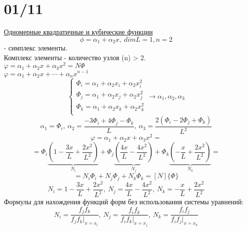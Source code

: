 \documentclass{bmstu}
\begin{document}
\section*{01/11}
\underline{Одномерные квадратичные и кубические функции}
\[
\phi = \alpha_1 + \alpha_2x, \ dim L = 1, n = 2
\]
- симплекс элементы. \\
Комплекс элементы - количество узлов (n) > 2. \\
$\varphi = \alpha_1 + \alpha_2x + \alpha_3x^2 = N \Phi$\\
$\varphi = \alpha_1 + \alpha_2x + \cdots + \alpha_nx^{n-1}$\\
\[
\begin{cases}
\Phi_i = \alpha_1 + \alpha_2x_i + \alpha_2x^{2}_i \\
\Phi_j = \alpha_1 + \alpha_2x_j + \alpha_2x^{2}_j \\
\Phi_k = \alpha_1 + \alpha_2x_k + \alpha_2x^{2}_k \\
\end{cases}
\rightarrow \alpha_1, \alpha_2, \alpha_3
\]
\[
\alpha_1 = \Phi_i, \ \alpha_2 = \frac{-3\Phi_i + 4\Phi_j -\Phi_k}{L}, \ \alpha_3 = \frac{2(\Phi_i-2\Phi_j+\Phi_k)}{L^2}
\]
\[
\varphi = \alpha_1 + \alpha_2x + \alpha_3x^2 = 
\]
\[
 = \Phi_i   \underbrace{\left(1 - \frac{3x}{L} + \frac{2x^2}{L^2} \right) }_{N_i}   + \Phi_j \underbrace{\left(\frac{4x}{L} - \frac{4x^2}{L^2} \right)}_{N_j} + \Phi_k \underbrace{\left(-\frac{x}{L} + \frac{2x^2}{L^2} \right)}_{N_k} = 
\]
\[
 = N_i \Phi_i + N_j \Phi_j + N_k \Phi_k = [N]\{\Phi\}
\]
\[
N_i = 1 - \frac{3x}{L} + \frac{2x^2}{L^2}, \ N_j = \frac{4x}{L} - \frac{4x^2}{L^2}, \ N_k = -\frac{x}{L} + \frac{2x^2}{L^2}
\]
Формулы для нахождения функций форм без использования системы уравнений: 
\[
N_i = \frac{f_jf_k}{f_jf_k|_{x = x_i}}, \ N_j = \frac{f_if_k}{f_if_k|_{x = x_j}}, \ N_k = \frac{f_if_j}{f_if_j|_{x = x_k}}
\]
\end{document}
